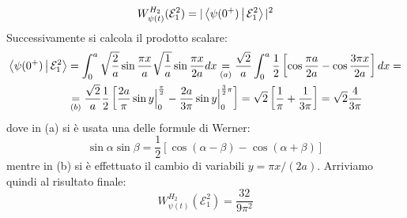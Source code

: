 \documentclass[../../FisicaTeorica.tex]{subfiles}
\begin{document}
\begin{enumerate}
\[
W^{H_2}_{\psi(t)}(\mathcal{E}_1^2) = |\Braket{\psi(0^+)|\mathcal{E}_1^2}|^2
\]
Successivamente si calcola il prodotto scalare:
\begin{align*}
\Braket{\psi(0^+)|\mathcal{E}_1^2} &= \int_0^a \sqrt{\frac{2}{a}} \sin \frac{\pi x}{a} \sqrt{\frac{1}{a}} \sin \frac{\pi x}{2a} dx\underset{(a)}{=} \frac{\sqrt{2}}{a} \int_0^a \frac{1}{2} \left [
\cos \frac{\pi a}{2a}-\cos \frac{3\pi x}{2a}
\right ]dx =\\
&\underset{(b)}{=}\frac{\sqrt{2}}{a}\frac{1}{2}\left [
\frac{2a}{\pi} \sin y \Big |_0^{\frac{\pi}{2}} - \frac{2a}{3\pi}\sin y \Big|_{0}^{\frac{3}{2}\pi}\right ] = \sqrt{2}\left [
\frac{1}{\pi}+\frac{1}{3\pi}
\right] = \sqrt{2}\frac{4}{3\pi}
\end{align*}
dove in (a) si è usata una delle formule di Werner:
\[
\sin \alpha \sin \beta= \frac{1}{2}[\cos(\alpha-\beta)-\cos(\alpha+\beta)]
\]
mentre in (b) si è effettuato il cambio di variabili $y=\pi x/(2a)$.
Arriviamo quindi al risultato finale:
\[
W_{\psi(t)}^{H_2}(\mathcal{E}_1^2)=\frac{32}{9\pi^2}
\]
\end{enumerate}
\end{document}

